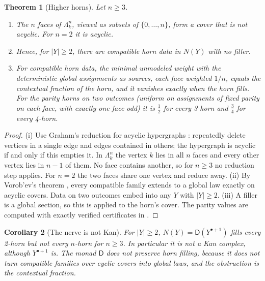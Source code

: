 \documentclass[11pt]{article}
\newtheorem{theorem}{Theorem}[section]
\newtheorem{corollary}[theorem]{Corollary}
\theoremstyle{definition}
\theoremstyle{remark}
\newcommand{\D}{\mathsf{D}}
\begin{document}
\begin{theorem}[Higher horns]\label{thm:higherhorn}
Let $n\ge3$.
\begin{enumerate}[label=(\roman*)]
\item The $n$ faces of $\Lambda^n_k$, viewed as subsets of $\{0,\dots,n\}$, form a cover that is not acyclic. For $n=2$ it is
  acyclic.
\item Hence, for $\lvert Y\rvert\ge2$, there are compatible horn data in $N(Y)$ with no filler.
\item For compatible horn data, the minimal unmodeled weight with the deterministic global assignments as
  sources, each face weighted $1/n$, equals the contextual fraction of the horn, and it vanishes exactly when
  the horn fills. For the parity horns on two outcomes (uniform on assignments of fixed parity on each face, with
  exactly one face odd) it is $\tfrac12$ for every 3-horn and $\tfrac34$ for every 4-horn.
\end{enumerate}
\end{theorem}
\begin{proof}
(i) Use Graham's reduction for acyclic hypergraphs \cite{BFMY1983}: repeatedly delete vertices in a single edge and
edges contained in others; the hypergraph is acyclic if and only if this empties it. In $\Lambda^n_k$ the vertex $k$
lies in all $n$ faces and every other vertex lies in $n-1$ of them. No face contains another, so for $n\ge3$ no
reduction step applies. For $n=2$ the two faces share one vertex and reduce away. (ii) By Vorob'ev's theorem
\cite{Vorobev1962}, every compatible family extends to a global law exactly on acyclic covers. Data on two outcomes
embed into any $Y$ with $\lvert Y\rvert\ge2$. (iii) A filler is a global section, so this is
\cite[Thm.~7.12]{Awasthi-Attribution} applied to the horn's cover. The parity values are computed with exactly verified
certificates in \cite[\S10]{Awasthi-Family}.
\end{proof}

\begin{corollary}[The nerve is not Kan]\label{cor:notkan}
For $\lvert Y\rvert\ge2$, $N(Y)=\D(Y^{\bullet+1})$ fills every 2-horn but not every $n$-horn for $n\ge3$. In particular it is not
a Kan complex, although $Y^{\bullet+1}$ is. The monad $\D$ does not preserve horn filling, because it does not turn
compatible families over cyclic covers into global laws, and the obstruction is the contextual fraction.
\end{corollary}
\end{document}
